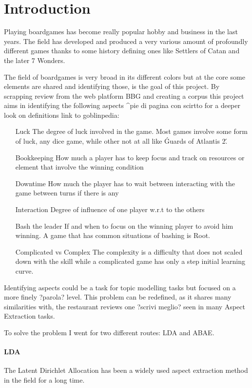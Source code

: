 \section{Introduction}

Playing boardgames has become really popular hobby and business in the last years.
The field has developed and produced a very various amount of profoundly different games thanks to some history defining
ones like Settlers of Catan and the later 7 Wonders.

The field of boardgames is very broad in its different colors but at the core some elements are shared and
identifying those, is the goal of this project.
By scrapping review from the web platform BBG and creating a corpus this project aims in identifying the following aspects
^pie di pagina con scirtto for a deeper look on definitions link to goblinpedia:
\begin{itemize}
    \item[Luck] The degree of luck involved in the game.
    Most games involve some form of luck, any dice game, while other not at all like \'Guards of Atlantis 2\'.
    \item[Bookkeeping] How much a player has to keep focus and track on resources or element that involve the winning condition
    \item[Downtime] How much the player has to wait between interacting with the game between turns if there is any
    \item[Interaction] Degree of influence of one player w.r.t to the others
    \item[Bash the leader] If and when to focus on the winning player to avoid him winning.
    A game that has common situations of bashing is Root.
    \item[Complicated vs Complex] The complexity is a difficulty that does not scaled down with the skill while
    a complicated game has only a step initial learning curve.
\end{itemize}

Identifying aspects could be a task for topic modelling tasks but focused on a more finely ?parola? level.
This problem can be redefined, as it shares many similarities with, the restaurant reviews one ?scrivi meglio? seen in many Aspect Extraction tasks.

To solve the problem I went for two different routes: LDA and ABAE.

\paragraph{LDA} The Latent Dirichlet Allocation has been a widely used aspect extraction method in the field for a long time.

